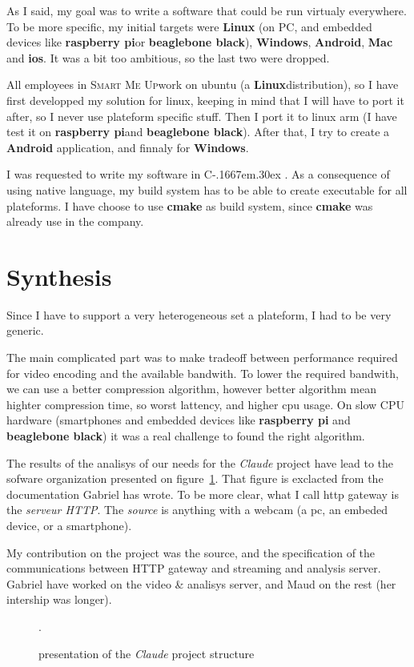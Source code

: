 \documentclass[a4paper,11pt]{custom}
\newcommand{\smu}{\textsc{Smart Me Up}}
\newcommand{\cmake}{\textbf{cmake}}
\newcommand{\rpi}{\textbf{raspberry pi}}
\newcommand{\bbb}{\textbf{beaglebone black}}
\newcommand{\linux}{\textbf{Linux}}
\newcommand{\win}{\textbf{Windows}}
\newcommand{\mac}{\textbf{Mac}}
\newcommand{\android}{\textbf{Android}}
\newcommand{\ios}{\textbf{ios}}
\newcommand{\claude}{\textit{Claude}}
\newcommand{\cpp}{%
  C\kern-.1667em\raise.30ex\hbox{\smaller{++}}%
  \spacefactor1000%
}
\begin{document}
As I said, my goal was to write a software that could be run virtualy
everywhere. To be more specific, my initial targets were \linux{} (on PC, and
embedded devices like \rpi or \bbb), \win, \android, \mac{} and \ios. It was a
bit too ambitious, so the last two were dropped.

All employees in \smu work on ubuntu (a \linux distribution), so I have first
developped my solution for linux, keeping in mind that I will have to port it
after, so I never use plateform specific stuff. Then I port it to linux arm (I
have test it on \rpi and \bbb). After that, I try to create a \android
application, and finnaly for \win.

I was requested to write my software in \cpp. As a consequence of using native
language, my build system has to be able to create executable for all
plateforms. I have choose to use \cmake{} as build system, since \cmake{} was
already use in the company.

\section{Synthesis}

Since I have to support a very heterogeneous set a plateform, I had to be very
generic.

The main complicated part was to make tradeoff between performance required for
video encoding and the available bandwith. To lower the required bandwith, we
can use a better compression algorithm, however better algorithm mean highter
compression time, so worst lattency, and higher cpu usage. On slow CPU hardware
(smartphones and embedded devices like \rpi{} and \bbb{}) it was a real
challenge to found the right algorithm.

The results of the analisys of our needs for the \claude{} project have lead to
the sofware organization presented on figure~\ref{fig:architecture}. That figure
is exclacted from the documentation Gabriel has wrote. To be more clear, what I
call http gateway is the \textit{serveur HTTP}. The \textit{source} is anything
with a webcam (a pc, an embeded device, or a smartphone).

My contribution on the project was the source, and the specification of the
communications between HTTP gateway and streaming and analysis server. Gabriel
have worked on the video \& analisys server, and Maud on the rest (her intership
was longer).

\begin{figure}
  \centering
  \def\svgwidth{\columnwidth}
  
  \label{fig:architecture}
  \caption{presentation of the \claude{} project structure}.
\end{figure}
\end{document}
